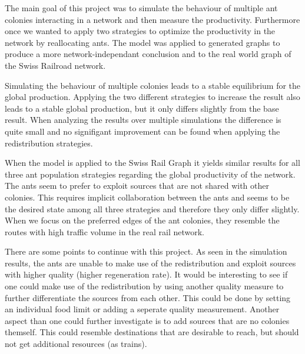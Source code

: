 The main goal of this project was to simulate the behaviour of multiple ant colonies interacting in a network and then measure the productivity. Furthermore once we wanted to apply two strategies to optimize the productivity in the network by reallocating ants. The model was applied to generated graphs to produce a more network-independant conclusion and to the real world graph of the Swiss Railroad network.

Simulating the behaviour of multiple colonies leads to a stable equilibrium for the global production. Applying the two different strategies to increase the result also leads to a stable global production, but it only differs slightly from the base result. When analyzing the results over multiple simulations the difference is quite small and no signifigant improvement can be found when applying the redistribution strategies.

When the model is applied to the Swiss Rail Graph it yields similar results for all three ant population strategies regarding the global productivity of the network. The ants seem to prefer to exploit sources that are not shared with other colonies. This requires implicit collaboration between the ants and seems to be the desired state among all three strategies and therefore they only differ slightly. When we focus on the preferred edges of the ant colonies, they resemble the routes with high traffic volume in the real rail network.

There are some points to continue with this project. As seen in the simulation results, the ants are unable to make use of the redistribution and exploit sources with higher quality (higher regeneration rate). It would be interesting to see if one could make use of the redistribution by using another quality measure to further differentiate the sources from each other. This could be done by setting an individual food limit or adding a seperate quality measurement. Another aspect than one could further investigate is to add sources that are no colonies themself. This could resemble destinations that are desirable to reach, but should not get additional resources (as trains).